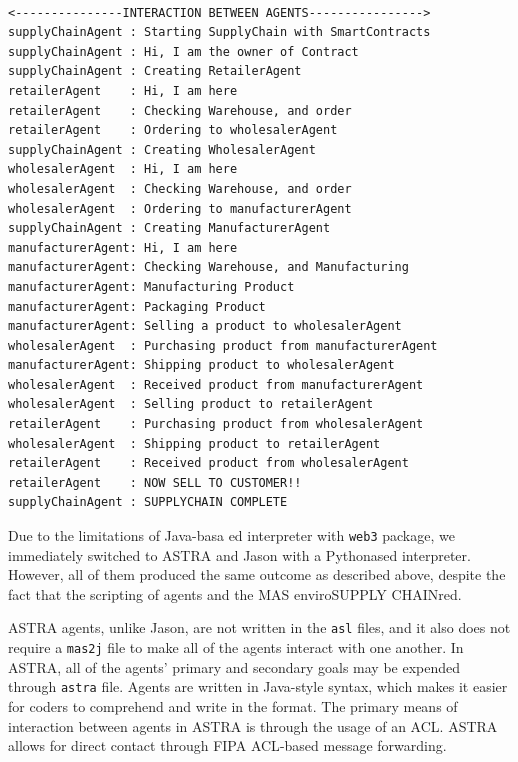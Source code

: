 \begin{lstlisting}[numbers=none, basicstyle=\ttfamily\tiny]

<---------------INTERACTION BETWEEN AGENTS---------------->
supplyChainAgent : Starting SupplyChain with SmartContracts
supplyChainAgent : Hi, I am the owner of Contract
supplyChainAgent : Creating RetailerAgent
retailerAgent    : Hi, I am here
retailerAgent    : Checking Warehouse, and order
retailerAgent    : Ordering to wholesalerAgent
supplyChainAgent : Creating WholesalerAgent
wholesalerAgent  : Hi, I am here
wholesalerAgent  : Checking Warehouse, and order
wholesalerAgent  : Ordering to manufacturerAgent
supplyChainAgent : Creating ManufacturerAgent
manufacturerAgent: Hi, I am here
manufacturerAgent: Checking Warehouse, and Manufacturing
manufacturerAgent: Manufacturing Product
manufacturerAgent: Packaging Product
manufacturerAgent: Selling a product to wholesalerAgent
wholesalerAgent  : Purchasing product from manufacturerAgent
manufacturerAgent: Shipping product to wholesalerAgent
wholesalerAgent  : Received product from manufacturerAgent
wholesalerAgent  : Selling product to retailerAgent
retailerAgent    : Purchasing product from wholesalerAgent
wholesalerAgent  : Shipping product to retailerAgent
retailerAgent    : Received product from wholesalerAgent
retailerAgent    : NOW SELL TO CUSTOMER!!
supplyChainAgent : SUPPLYCHAIN COMPLETE
\end{lstlisting}

\vspace{.5cm}

Due to the limitations of Java-basa ed interpreter with \texttt{web3} package, we immediately switched to ASTRA and Jason with a Pythonased interpreter. However, all of them produced the same outcome as described above, despite the fact that the scripting of agents and the \ac{MAS} enviroSUPPLY CHAINred.

\vspace{.5cm}

ASTRA agents, unlike Jason, are not written in the \texttt{asl} files, and it also does not require a \texttt{mas2j} file to make all of the agents interact with one another. In ASTRA, all of the agents' primary and secondary goals may be expended through \texttt{astra} file. Agents are written in Java-style syntax, which makes it easier for coders to comprehend and write in the format. The primary means of interaction between agents in ASTRA is through the usage of an \ac{ACL}. ASTRA allows for direct contact through \ac{FIPA} \ac{ACL}-based message forwarding.

